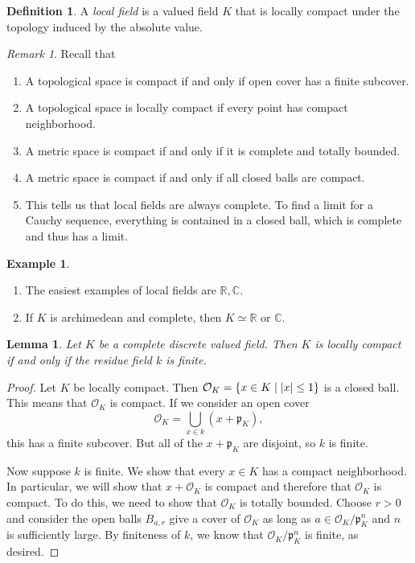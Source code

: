 \documentclass[leqno, openany]{memoir}
\newtheorem{lem}[thm]{Lemma}
\theoremstyle{definition}
\newtheorem{defn}[thm]{Definition}
\newtheorem{exm}[thm]{Example}
\theoremstyle{remark}
\newtheorem{rmk}[thm]{Remark}
\theoremstyle{plain}
\theoremstyle{definition}
\theoremstyle{remark}
\newcommand{\R}{\mathbb{R}}
\newcommand{\C}{\mathbb{C}}
\newcommand{\mc}[1]{\mathcal{#1}}
\newcommand{\mf}[1]{\mathfrak{#1}}
\begin{document}
\begin{defn}
    A \textit{local field} is a valued field $K$ that is locally compact under the topology induced by the absolute value.
\end{defn}

\begin{rmk}
    Recall that
    \begin{enumerate}
        \item A topological space is compact if and only if open cover has a finite subcover.
        \item A topological space is locally compact if every point has compact neighborhood.
        \item A metric space is compact if and only if it is complete and totally bounded.
        \item A metric space is compact if and only if all closed balls are compact.
        \item This tells us that local fields are always complete. To find a limit for a Cauchy sequence, everything is contained in a closed ball, which is complete and thus has a limit.
    \end{enumerate}
\end{rmk}

\begin{exm}\leavevmode
    \begin{enumerate}
        \item The easiest examples of local fields are $\R, \C$.
        \item If $K$ is archimedean and complete, then $K \simeq \R$ or $\C$.
    \end{enumerate}
\end{exm}

\begin{lem}
    Let $K$ be a complete discrete valued field. Then $K$ is locally compact if and only if the residue field $k$ is finite.
\end{lem}

\begin{proof}
    Let $K$ be locally compact. Then $\mc{O}_K = \qty{x \in K \mid \abs{x} \leq 1}$ is a closed ball. This means that $\mc{O}_K$ is compact. If we consider an open cover
    \[ \mc{O}_K = \bigcup_{x \in k} (x + \mf{p}_K), \]
    this has a finite subcover. But all of the $x + \mf{p}_K$ are disjoint, so $k$ is finite.

    Now suppose $k$ is finite. We show that every $x \in K$ has a compact neighborhood. In particular, we will show that $x + \mc{O}_K$ is compact and therefore that $\mc{O}_K$ is compact. To do this, we need to show that $\mc{O}_K$ is totally bounded. Choose $r > 0$ and consider the open balls $B_{a,r}$ give a cover of $\mc{O}_K$ as long as $a \in \mc{O}_K / \mf{p}_K^n$ and $n$ is sufficiently large. By finiteness of $k$, we know that $\mc{O}_K /\mf{p}_K^n$ is finite, as desired.
\end{proof}
\end{document}
